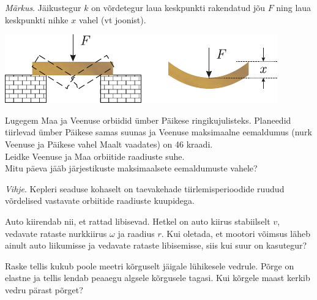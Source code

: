 \documentclass[10pt, twoside]{article}
\begin{document}
{\emph{Märkus}. Jäikustegur $k$ on võrdetegur laua keskpunkti rakendatud jõu $F$ ning laua keskpunkti nihke $x$ vahel (vt joonist).

\begin{center}
	\includegraphics[width=0.8\linewidth]{2007-lahg-06-yl}
\end{center}
\probend
\bigskip


Lugegem Maa ja Veenuse orbiidid ümber Päikese ringikujulisteks. Planeedid tiirlevad ümber Päikese samas suunas ja Veenuse maksimaalne eemaldumus (nurk Veenuse ja Päikese vahel Maalt vaadates) on 46 kraadi.\\
\osa Leidke Veenuse ja Maa orbiitide raadiuste suhe.\\
\osa Mitu päeva jääb järjestikuste maksimaalsete eemaldumuste vahele?

\emph{Vihje}. Kepleri seaduse kohaselt on taevakehade tiirlemisperioodide ruudud võrdelised vastavate orbiitide raadiuste kuupidega.
\probend
\bigskip


Auto kiirendab nii, et rattad libisevad. Hetkel on auto kiirus stabiilselt $v$, vedavate rataste nurkkiirus $\omega$ ja raadius $r$. Kui oletada, et mootori võimsus läheb ainult auto liikumisse ja vedavate rataste libisemisse, siis kui suur on kasutegur?
\probend
\bigskip


Raske tellis kukub poole meetri kõrguselt jäigale lühikesele vedrule. Põrge
on elastne ja tellis lendab peaaegu algsele kõrgusele tagasi. Kui
kõrgele maast kerkib vedru pärast põrget?
\probend
\bigskip


}
\end{document}
